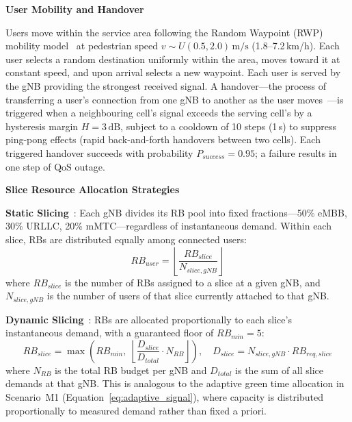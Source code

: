 \medskip\noindent\textbf{User Mobility and Handover}

Users move within the service area following the Random Waypoint (RWP) mobility model~\cite{random_waypoint} at pedestrian speed $v \sim U(0.5, 2.0)\,\text{m/s}$ (1.8--7.2\,km/h). Each user selects a random destination uniformly within the area, moves toward it at constant speed, and upon arrival selects a new waypoint. Each user is served by the gNB providing the strongest received signal. A handover---the process of transferring a user's connection from one gNB to another as the user moves~\cite{3gpp_38300}---is triggered when a neighbouring cell's signal exceeds the serving cell's by a hysteresis margin $H = 3\,\text{dB}$, subject to a cooldown of 10 steps (1\,s) to suppress ping-pong effects (rapid back-and-forth handovers between two cells). Each triggered handover succeeds with probability $P_{success} = 0.95$; a failure results in one step of QoS outage.

\medskip\noindent\textbf{Slice Resource Allocation Strategies}

\textbf{Static Slicing}~\cite{network_slicing_survey}: Each gNB divides its RB pool into fixed fractions---50\% eMBB, 30\% URLLC, 20\% mMTC---regardless of instantaneous demand. Within each slice, RBs are distributed equally among connected users:
\begin{equation}
    RB_{user} = \left\lfloor \frac{RB_{slice}}{N_{slice,gNB}} \right\rfloor
    \label{eq:static_alloc}
\end{equation}
where $RB_{slice}$ is the number of RBs assigned to a slice at a given gNB, and $N_{slice,gNB}$ is the number of users of that slice currently attached to that gNB.

\textbf{Dynamic Slicing}~\cite{network_slicing_survey}: RBs are allocated proportionally to each slice's instantaneous demand, with a guaranteed floor of $RB_{min} = 5$:
\begin{equation}
    RB_{slice} = \max\!\left(RB_{min},\; \left\lfloor \frac{D_{slice}}{D_{total}} \cdot N_{RB} \right\rfloor\right), \quad D_{slice} = N_{slice,gNB} \cdot RB_{req,slice}
    \label{eq:dynamic_alloc}
\end{equation}
where $N_{RB}$ is the total RB budget per gNB and $D_{total}$ is the sum of all slice demands at that gNB.
This is analogous to the adaptive green time allocation in Scenario~M1 (Equation~\ref{eq:adaptive_signal}), where capacity is distributed proportionally to measured demand rather than fixed a priori.

